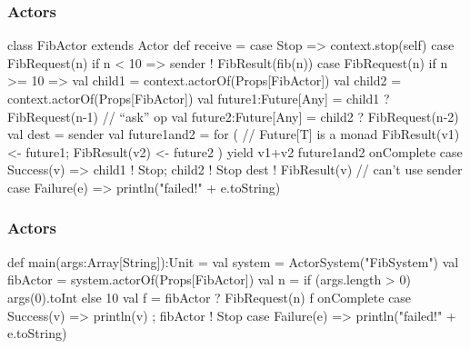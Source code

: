 \documentclass{beamer}
\newcommand{\beb}{\begin{exampleblock}}
\newcommand{\eeb}{\end{exampleblock}}
\begin{document}
\begin{frame}[fragile]
\frametitle{Actors}
\beb{}
{\scriptsize
\begin{code}
class FibActor extends Actor {
  def receive = {
    case Stop => context.stop(self)
    case FibRequest(n) if n < 10 => sender ! FibResult(fib(n))
    case FibRequest(n) if n >= 10 => {
      val child1 = context.actorOf(Props[FibActor]) 
      val child2 = context.actorOf(Props[FibActor])
      val future1:Future[Any] = child1 ? FibRequest(n-1) // ``ask'' op
      val future2:Future[Any] = child2 ? FibRequest(n-2)
      val dest = sender
      val future1and2 = for ( // Future[T] is a monad
        FibResult(v1) <- future1;
        FibResult(v2) <- future2 
      ) yield v1+v2
      future1and2 onComplete {
        case Success(v) => 
        child1 ! Stop; child2 ! Stop
        dest ! FibResult(v) // can't use sender
        case Failure(e) => println("failed!" + e.toString)
      }
    }
  }
}
\end{code}
}
\eeb
\end{frame}

\begin{frame}[fragile]
\frametitle{Actors}
\beb{}
\begin{code}
def main(args:Array[String]):Unit = {
  val system = ActorSystem("FibSystem")
  val fibActor = system.actorOf(Props[FibActor])
  val n = if (args.length > 0) args(0).toInt else 10
  val f = fibActor ? FibRequest(n)
  f onComplete {
    case Success(v) => { println(v) ; fibActor ! Stop}
    case Failure(e) => println("failed!" + e.toString)
  }
}
\end{code}
\eeb
\end{frame}
\end{document}
